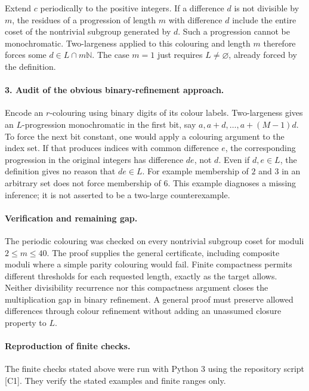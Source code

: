 \documentclass[11pt,a4paper]{article}
\begin{document}
Extend $c$ periodically to the positive integers. If a difference $d$
is not divisible by $m$, the residues of a progression of length $m$
with difference $d$ include the entire coset of the nontrivial subgroup
generated by $d$. Such a progression cannot be monochromatic.
Two-largeness applied to this colouring and length $m$ therefore forces
some $d\in L\cap m\mathbb N$. The case $m=1$ just requires
$L\ne\varnothing$, already forced by the definition.

\paragraph{3. Audit of the obvious binary-refinement approach.}
Encode an $r$-colouring using binary digits of its colour labels.
Two-largeness gives an $L$-progression monochromatic in the first
bit, say $a,a+d,\ldots,a+(M-1)d$. To force the next bit constant,
one would apply a colouring argument to the index set. If that
produces indices with common difference $e$, the corresponding
progression in the original integers has difference $de$, not $d$.
Even if $d,e\in L$, the definition gives no reason that $de\in L$.
For example membership of $2$ and $3$ in an arbitrary set does not
force membership of $6$. This example diagnoses a missing inference;
it is not asserted to be a two-large counterexample.

\paragraph{Verification and remaining gap.}
The periodic colouring was checked on every nontrivial subgroup coset
for moduli $2\le m\le40$. The proof supplies the general certificate,
including composite moduli where a simple parity colouring would fail.
Finite compactness permits different thresholds for each requested
length, exactly as the target allows. Neither divisibility recurrence
nor this compactness argument closes the multiplication gap in binary
refinement. A general proof must preserve allowed differences through
colour refinement without adding an unassumed closure property to $L$.

\paragraph{Reproduction of finite checks.}
The finite checks stated above were run with Python 3 using the repository
script [C1]. They verify the stated examples and finite ranges only.
\end{document}
